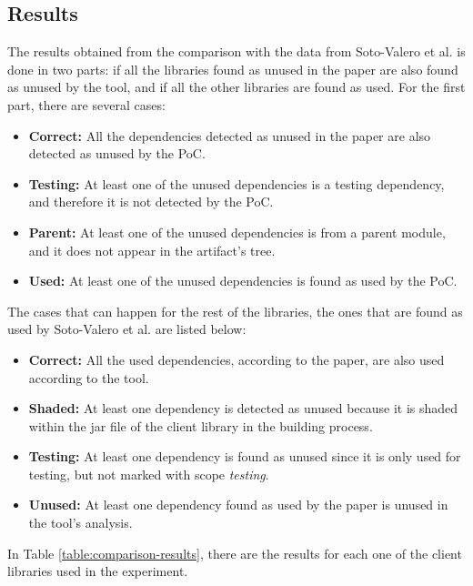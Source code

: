 \subsection{Results}

The results obtained from the comparison with the data from Soto-Valero et al. \cite{soto2020comprehensive} is done in two parts: if all the libraries found as unused in the paper are also found as unused by the tool, and if all the other libraries are found as used. For the first part, there are several cases:

\begin{itemize}
  \item \textbf{Correct:} All the dependencies detected as unused in the paper are also detected as unused by the PoC.
  \item \textbf{Testing:} At least one of the unused dependencies is a testing dependency, and therefore it is not detected by the PoC.
  \item \textbf{Parent:} At least one of the unused dependencies is from a parent module, and it does not appear in the artifact's tree.
  \item \textbf{Used:} At least one of the unused dependencies is found as used by the PoC.
\end{itemize}

The cases that can happen for the rest of the libraries, the ones that are found as used by Soto-Valero et al. are listed below:

\begin{itemize}
  \item \textbf{Correct:} All the used dependencies, according to the paper, are also used according to the tool.
  \item \textbf{Shaded:} At least one dependency is detected as unused because it is shaded within the jar file of the client library in the building process.
  \item \textbf{Testing:} At least one dependency is found as unused since it is only used for testing, but not marked with scope \textit{testing}.
  \item \textbf{Unused:} At least one dependency found as used by the paper is unused in the tool's analysis.
\end{itemize}

In Table \ref{table:comparison-results}, there are the results for each one of the client libraries used in the experiment.

